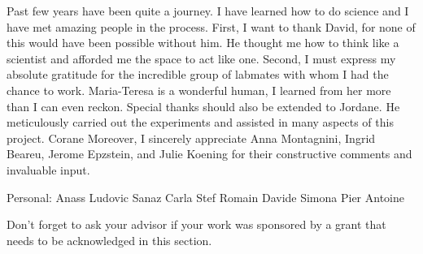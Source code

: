Past few years have been quite a journey.
I have learned how to do science and I have met amazing people in the process.
First, I want to thank David, for none of this would have been possible without him.
He thought me how to think like a scientist and afforded me the space to act like one.
Second, I must express my absolute gratitude for the incredible group of labmates with whom I had the chance to work.
Maria-Teresa is a wonderful human, I learned from her more than I can even reckon.
Special thanks should also be extended to Jordane.
He meticulously carried out the experiments and assisted in many aspects of this project.
Corane 
Moreover, I sincerely appreciate Anna Montagnini, Ingrid Beareu, Jerome Epzstein, and Julie Koening for their constructive comments and invaluable input.
\par

Personal:
Anass
Ludovic
Sanaz
Carla
Stef
Romain
Davide
Simona
Pier Antoine






Don't forget to ask your advisor if your work was sponsored by a grant that needs to be acknowledged in this section.  